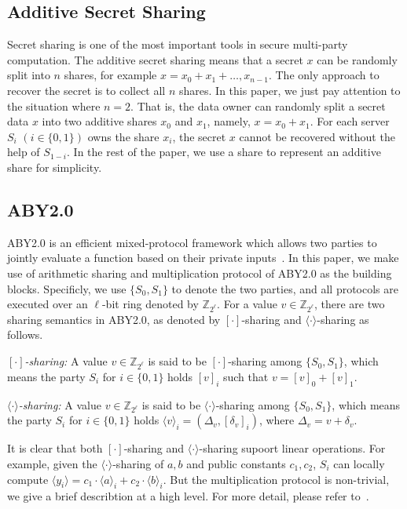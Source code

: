 \documentclass[conference]{IEEEtran}
\begin{document}
\subsection{Additive Secret Sharing}
Secret sharing is one of the most important tools in secure multi-party computation.
The additive secret sharing means that a secret $x$ can be randomly split into $n$ shares, for example $x = x_0 + x_1 + \ldots, x_{n-1}$.
The only approach to recover the secret is to collect all $n$ shares.
In this paper, we just pay attention to the situation where $n=2$.
That is, the data owner can randomly split a secret data $x$ into two additive shares $x_0$ and $x_1$, namely, $x = x_0 + x_1$.
For each server $S_i$ $(i\in\{0,1\})$ owns the share $x_i$, the secret $x$ cannot be recovered without the help of $S_{1-i}$.
In the rest of the paper, we use a share to represent an additive share for simplicity.

\iffalse
\subsection{ABY2.0}
ABY2.0 is an efficient mixed-protocol framework which allows two parties to jointly evaluate a function based on their private inputs~\cite{patra_aby20_2020}.
In this paper, we make use of arithmetic sharing and multiplication protocol of ABY2.0 as the building blocks.
Specificly, we use $\{S_0, S_1\}$ to denote the two parties, and all protocols are executed over an $\ell$-bit ring denoted by $\mathbb{Z}_{2^\ell}$.
For a value $v\in\mathbb{Z}_{2^\ell}$, there are two sharing semantics in ABY2.0, as denoted by $[\cdot]$-sharing and $\langle \cdot \rangle$-sharing as follows.

\textit{$[\cdot]$-sharing:} A value $v\in\mathbb{Z}_{2^\ell}$ is said to be $[\cdot]$-sharing among $\{S_0, S_1\}$, which means the party $S_i$ for $i\in\{0,1\}$ holds $[v]_i$ such that $v = [v]_0 + [v]_1$.

\textit{$\langle \cdot \rangle$-sharing:} A value $v\in\mathbb{Z}_{2^\ell}$ is said to be $\langle \cdot \rangle$-sharing among $\{S_0, S_1\}$, which means the party $S_i$ for $i\in\{0,1\}$ holds $\langle v \rangle_i = (\Delta_v, [\delta_v]_i)$, where $\Delta_v = v + \delta_v$.

It is clear that both $[\cdot]$-sharing and $\langle \cdot \rangle$-sharing supoort linear operations.
For example, given the $\langle \cdot \rangle$-sharing of $a,b$ and public constants $c_1,c_2$, $S_i$ can locally compute $\langle y_i \rangle = c_1 \cdot \langle a \rangle_i + c_2 \cdot \langle b \rangle_i$.
But the multiplication protocol is non-trivial, we give a brief describtion at a high level.
For more detail, please refer to~\cite{patra_aby20_2020}.
\end{document}
